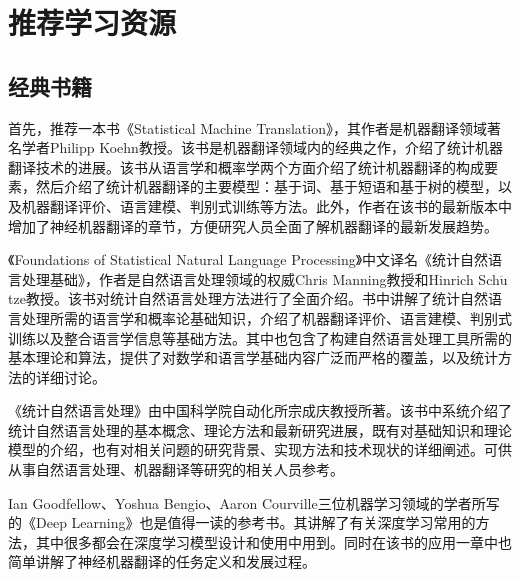 
\sectionnewpage
\section{推荐学习资源}

\subsection{经典书籍}

\parinterval 首先，推荐一本书《Statistical Machine Translation》\cite{koehn2009statistical}，其作者是机器翻译领域著名学者Philipp Koehn教授。该书是机器翻译领域内的经典之作，介绍了统计机器翻译技术的进展。该书从语言学和概率学两个方面介绍了统计机器翻译的构成要素，然后介绍了统计机器翻译的主要模型：基于词、基于短语和基于树的模型，以及机器翻译评价、语言建模、判别式训练等方法。此外，作者在该书的最新版本中增加了神经机器翻译的章节，方便研究人员全面了解机器翻译的最新发展趋势\cite{DBLP:journals/corr/abs-1709-07809}。

\parinterval 《Foundations of Statistical Natural Language Processing》\cite{manning1999foundations}中文译名《统计自然语言处理基础》，作者是自然语言处理领域的权威Chris Manning教授和Hinrich Sch$\ddot{\textrm{u}}$tze教授。该书对统计自然语言处理方法进行了全面介绍。书中讲解了统计自然语言处理所需的语言学和概率论基础知识，介绍了机器翻译评价、语言建模、判别式训练以及整合语言学信息等基础方法。其中也包含了构建自然语言处理工具所需的基本理论和算法，提供了对数学和语言学基础内容广泛而严格的覆盖，以及统计方法的详细讨论。

\parinterval 《统计自然语言处理》\cite{宗成庆2013统计自然语言处理}由中国科学院自动化所宗成庆教授所著。该书中系统介绍了统计自然语言处理的基本概念、理论方法和最新研究进展，既有对基础知识和理论模型的介绍，也有对相关问题的研究背景、实现方法和技术现状的详细阐述。可供从事自然语言处理、机器翻译等研究的相关人员参考。

\parinterval  Ian Goodfellow、Yoshua Bengio、Aaron Courville三位机器学习领域的学者所写的《Deep Learning》\cite{Goodfellow-et-al-2016}也是值得一读的参考书。其讲解了有关深度学习常用的方法，其中很多都会在深度学习模型设计和使用中用到。同时在该书的应用一章中也简单讲解了神经机器翻译的任务定义和发展过程。

